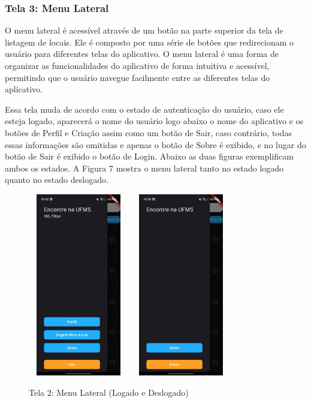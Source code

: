     \FloatBarrier

\subsubsection{Tela 3: Menu Lateral}

    O menu lateral é acessível através de um botão na parte superior da tela de listagem de locais. Ele é composto por uma série de botões que redirecionam o usuário para diferentes telas do aplicativo. O menu lateral é uma forma de organizar as funcionalidades do aplicativo de forma intuitiva e acessível, permitindo que o usuário navegue facilmente entre as diferentes telas do aplicativo.

    Essa tela muda de acordo com o estado de autenticação do usuário, caso ele esteja logado, aparecerá o nome do usuário logo abaixo o nome do aplicativo e os botões de Perfil e Criação assim como um botão de Sair, caso contrário, todas essas informações são omitidas e apenas o botão de Sobre é exibido, e no lugar do botão de Sair é exibido o botão de Login. Abaixo as duas figuras exemplificam ambos os estados. A Figura 7 mostra o menu lateral tanto no estado logado quanto no estado deslogado.

    \begin{figure}[h]
        \centering
        \includegraphics[width=44mm,height=80mm]{imagens/menu-lateral-logado.jpg}
        \hspace{10mm}
        \includegraphics[width=44mm,height=80mm]{imagens/menu-lateral-logout.jpg}
        \caption{\scriptsize Tela 2: Menu Lateral (Logado e Deslogado)}
        \footnotesize  {}
        \label{fig:tela2-logado}
    \end{figure}

